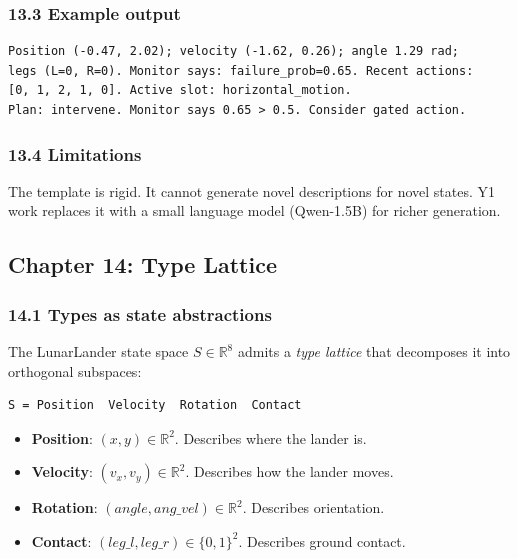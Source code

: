 \documentclass[11pt]{article}
\begin{document}
\subsubsection{13.3 Example output}

\begin{verbatim}
Position (-0.47, 2.02); velocity (-1.62, 0.26); angle 1.29 rad;
legs (L=0, R=0). Monitor says: failure_prob=0.65. Recent actions:
[0, 1, 2, 1, 0]. Active slot: horizontal_motion.
Plan: intervene. Monitor says 0.65 > 0.5. Consider gated action.
\end{verbatim}

\subsubsection{13.4 Limitations}

The template is rigid. It cannot generate novel descriptions for novel states.
Y1 work replaces it with a small language model (Qwen-1.5B) for richer
generation.

\hrulefill

\subsection{Chapter 14: Type Lattice}

\subsubsection{14.1 Types as state abstractions}

The LunarLander state space $S \in \mathbb{R}^{8}$ admits a \textit{type lattice} that decomposes it
into orthogonal subspaces:

\begin{verbatim}
S = Position  Velocity  Rotation  Contact
\end{verbatim}

\begin{itemize}
  \item \textbf{Position}: $(x, y) \in \mathbb{R}^2$. Describes where the lander is.
  \item \textbf{Velocity}: $(v_x, v_y) \in \mathbb{R}^2$. Describes how the lander moves.
  \item \textbf{Rotation}: $(\mathit{angle}, \mathit{ang\_vel}) \in \mathbb{R}^2$. Describes orientation.
  \item \textbf{Contact}: $(\mathit{leg\_l}, \mathit{leg\_r}) \in \{0,1\}^2$. Describes ground contact.
\end{itemize}
\end{document}
